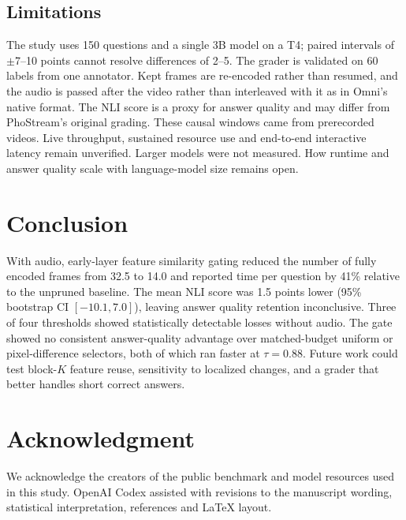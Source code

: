 \documentclass[conference]{IEEEtran}
\begin{document}
\subsection{Limitations}
The study uses 150 questions and a single 3B model on a T4; paired intervals of $\pm$7--10 points cannot resolve differences of 2--5. The grader is validated on 60 labels from one annotator. Kept frames are re-encoded rather than resumed, and the audio is passed after the video rather than interleaved with it as in Omni's native format. The NLI score is a proxy for answer quality and may differ from PhoStream's original grading. These causal windows came from prerecorded videos. Live throughput, sustained resource use and end-to-end interactive latency remain unverified. Larger models were not measured. How runtime and answer quality scale with language-model size remains open.

\section{Conclusion}
With audio, early-layer feature similarity gating reduced the number of fully encoded frames from 32.5 to 14.0 and reported time per question by 41\% relative to the unpruned baseline. The mean NLI score was 1.5 points lower (95\% bootstrap CI $[-10.1,7.0]$), leaving answer quality retention inconclusive. Three of four thresholds showed statistically detectable losses without audio. The gate showed no consistent answer-quality advantage over matched-budget uniform or pixel-difference selectors, both of which ran faster at $\tau{=}0.88$. Future work could test block-$K$ feature reuse, sensitivity to localized changes, and a grader that better handles short correct answers.

\section*{Acknowledgment}
We acknowledge the creators of the public benchmark and model resources used in this study. OpenAI Codex assisted with revisions to the manuscript wording, statistical interpretation, references and LaTeX layout.


\end{document}
